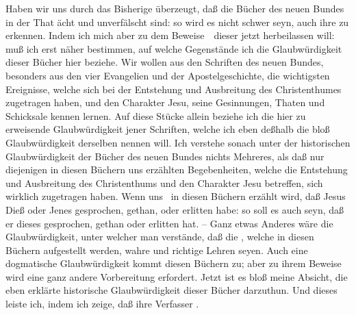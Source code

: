 Haben wir uns durch das Bisherige überzeugt, daß die Bücher des neuen Bundes in der That ächt und unverfälscht sind: so wird es nicht schwer seyn, auch ihre  zu erkennen. Indem ich mich aber zu dem Beweise~\ dieser jetzt herbeilassen will: muß ich erst näher bestimmen, auf welche Gegenstände ich die Glaubwürdigkeit dieser Bücher hier beziehe. Wir wollen aus den Schriften des neuen Bundes, besonders aus den vier Evangelien und der Apostelgeschichte, die wichtigsten Ereignisse, welche sich bei der Entstehung und Ausbreitung des Christenthumes zugetragen haben, und den Charakter Jesu, seine Gesinnungen, Thaten und Schicksale kennen lernen. Auf diese Stücke allein beziehe ich die hier zu erweisende Glaubwürdigkeit jener Schriften, welche ich eben deßhalb die bloß  Glaubwürdigkeit derselben nennen will. Ich verstehe sonach unter der historischen Glaubwürdigkeit der Bücher des neuen Bundes nichts Mehreres, als daß nur diejenigen in diesen Büchern uns erzählten Begebenheiten, welche die Entstehung und Ausbreitung des Christenthums und den Charakter Jesu betreffen, sich wirklich zugetragen haben. Wenn uns \zB\ in diesen Büchern erzählt wird, daß Jesus Dieß oder Jenes gesprochen, gethan, oder erlitten habe: so soll es auch  seyn, daß er dieses gesprochen, gethan oder erlitten hat. -- Ganz etwas Anderes wäre die  Glaubwürdigkeit, unter welcher man verstände, daß die , welche in diesen Büchern aufgestellt werden, wahre und richtige Lehren seyen. Auch eine dogmatische Glaubwürdigkeit kommt diesen Büchern zu; aber zu ihrem Beweise wird eine ganz andere Vorbereitung erfordert. Jetzt ist es bloß meine Absicht, die eben erklärte historische Glaubwürdigkeit dieser Bücher darzuthun. Und dieses leiste ich, indem ich zeige, daß ihre Verfasser .

